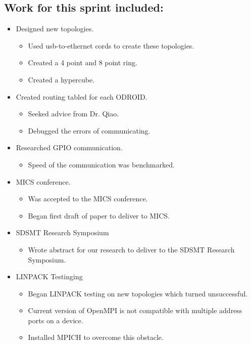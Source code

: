 \documentclass{article}
\begin{document}
\subsection*{Work for this sprint included:}
\begin{itemize}
	\item Designed new topologies.
	\begin{itemize}
		\item Used usb-to-ethernet cords to create these topologies.
		\item Created a 4 point and 8 point ring.
		\item Created a hypercube.
	\end{itemize}
	\item Created routing tabled for each ODROID.
	\begin{itemize}
		\item Seeked advice from Dr. Qiao.
		\item Debugged the errors of communicating.
	\end{itemize}
	\item Researched GPIO communication.
	\begin{itemize}
		\item Speed of the communication was benchmarked.
	\end{itemize} 
	\item MICS conference.
	\begin{itemize}
		\item Was accepted to the MICS conference.
		\item Began first draft of paper to deliver to MICS.
	\end{itemize}
	\item SDSMT Research Symposium
	\begin{itemize}
		\item Wrote abstract for our research to deliver to the SDSMT Research Symposium.
	\end{itemize}
	\item LINPACK Testinging
	\begin{itemize}
		\item Began LINPACK testing on new topologies which turned unsuccessful.
		\item Current version of OpenMPI is not compatible with multiple address ports on a device.
		\item Installed MPICH to overcome this obstacle.
	\end{itemize}
\end{itemize}
\end{document}
